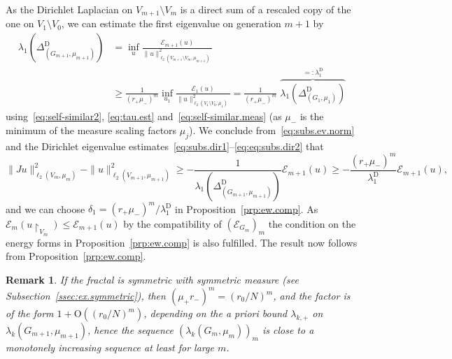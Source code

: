\documentclass[12pt,reqno,a4paper]{amsart}            %
\numberwithin{equation}{section}
\newcommand{\myfont}{\sffamily}
\theoremstyle{mythmstyle}       %
\theoremstyle{mydefstyle}        %
\newtheorem{remark}[theorem]{Remark}
\let\oldendproof\endproof
\renewenvironment{proof}[1][\bfseries\myfont\proofname]{%
  \oldproof[\bfseries \myfont #1]%
}{\oldendproof}
\newcommand{\Subsec}[1]{Subsection~\ref{ssec:#1}}
\newcommand{\Prp}[1]{Proposition~\ref{prp:#1}}
\newcommand{\normsymb}{\|}
\newcommand{\normsqr}[2][{}]{\normsymb{#2}\normsymb^2_{#1}} %
\newcommand{\restr}[1]{{\restriction}_{#1}} %
\newcommand{\1}{\mathbbm 1}                    %
\newcommand{\lsymb}    {\ell}          %
\newcommand{\lpspace}[1][p]    {\lsymb_{#1}}     %
\newcommand{\lsqrspace}    {\lpspace[2]}          %
\newcommand{\lsqr}[2][{}]{\lsqrspace^{#1}({#2})}   %
\newcommand{\Dir}{{\mathrm D}}              %
\newcommand{\Err}{\mathrm O}
\newcommand{\energy}{\mathcal E}
\begin{document}
\begin{proof}
  As the Dirichlet Laplacian on $V_{m+1}\setminus V_m$ is a direct sum
  of a rescaled copy of the one on  $V_1 \setminus V_0$, we can
  estimate the first eigenvalue on generation $m+1$ by
  \begin{align}
    \nonumber
    \lambda_1(\Delta_{(G_{m+1},\mu_{m+1})}^\Dir) 
    &= \inf_u \frac{\energy_{m+1}(u)}
      {\normsqr[\lsqr{V_{m+1}\setminus V_m,\mu_{m+1}}] u}\\
    \label{eq:eq:subs.dir2}
    &\ge \frac 1{(r_+\mu_-)^m}\inf_{u_1} \frac{\energy_1(u)}
      {\normsqr[\lsqr{V_1\setminus V_0,\mu_1}] u}
    = \frac 1{(r_+\mu_-)^m} \; 
    \overbrace{\lambda_1(\Delta_{(G_1,\mu_1)}^\Dir)}^{=:\lambda_1^\Dir}
  \end{align}
  using~\eqref{eq:self-similar2}, \eqref{eq:tau.est}
  and~\eqref{eq:self-similar.meas} (as $\mu_-$ is the minimum of the
  measure scaling factors $\mu_j$).  We conclude
  from~\eqref{eq:subs.ev.norm} and the Dirichlet eigenvalue
  estimates~\eqref{eq:subs.dir1}--\eqref{eq:eq:subs.dir2} that
  \begin{equation*}
    \normsqr[\lsqr{V_m,\mu_m}]{Ju} - \normsqr[\lsqr{V_{m+1},\mu_{m+1}}] u
    \ge - \frac 1 {\lambda_1(\Delta_{(G_{m+1},\mu_{m+1})}^\Dir)} \energy_{m+1}(u)
    \ge - \frac{(r_+\mu_-)^m}{\lambda_1^\Dir} \energy_{m+1}(u),
  \end{equation*}
  and we can choose $\delta_1=(r_+\mu_-)^m/\lambda_1^\Dir$ in
  \Prp{ew.comp}.  As $\energy_m(u \restr {V_m}) \le \energy_{m+1}(u)$
  by the compatibility of $(\energy_{G_m})_m$ the condition on the
  energy forms in \Prp{ew.comp} is also fulfilled.  The result now
  follows from \Prp{ew.comp}.
\end{proof}

\begin{remark}
  \label{rem:ew.subseq}
  If the fractal is symmetric with symmetric measure (see
  \Subsec{ex.symmetric}), then $(\mu_+r_-)^m=(r_0/N)^m$, and the
  factor is of the form $1+\Err((r_0/N)^m)$, depending on the a priori
  bound $\lambda_{k,+}$ on $\lambda_k(G_{m+1},\mu_{m+1})$, hence the
  sequence $(\lambda_k(G_m,\mu_m))_m$ is close to a monotonely
  increasing sequence at least for large $m$.
\end{remark}



%
\end{document}
